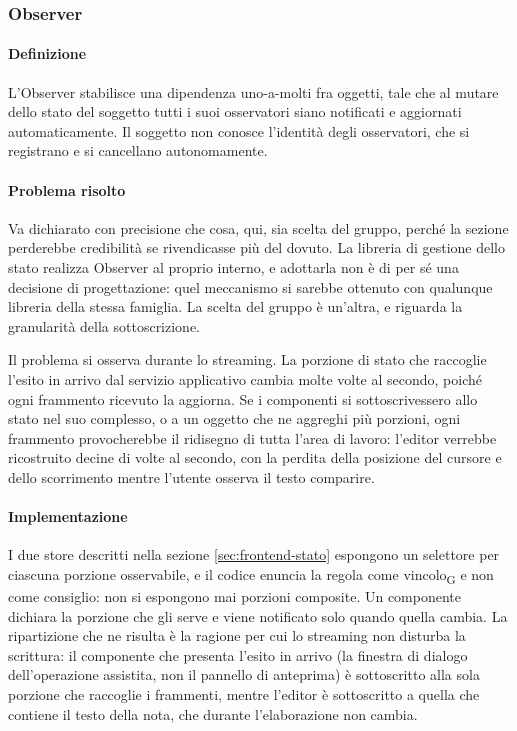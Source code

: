 \documentclass[a4paper, 10pt]{article}
\begin{document}
\subsubsection{Observer}
\label{sec:pattern-observer}

\paragraph{Definizione}
L'Observer stabilisce una dipendenza uno-a-molti fra oggetti, tale che al mutare dello stato del soggetto tutti i suoi osservatori siano notificati e aggiornati automaticamente. Il soggetto non conosce l'identità degli osservatori, che si registrano e si cancellano autonomamente.

\paragraph{Problema risolto}
Va dichiarato con precisione che cosa, qui, sia scelta del gruppo, perché la sezione perderebbe credibilità se rivendicasse più del dovuto. La libreria di gestione dello stato realizza Observer al proprio interno, e adottarla non è di per sé una decisione di progettazione: quel meccanismo si sarebbe ottenuto con qualunque libreria della stessa famiglia. La scelta del gruppo è un'altra, e riguarda la granularità della sottoscrizione.

Il problema si osserva durante lo streaming. La porzione di stato che raccoglie l'esito in arrivo dal servizio applicativo cambia molte volte al secondo, poiché ogni frammento ricevuto la aggiorna. Se i componenti si sottoscrivessero allo stato nel suo complesso, o a un oggetto che ne aggreghi più porzioni, ogni frammento provocherebbe il ridisegno di tutta l'area di lavoro: l'editor verrebbe ricostruito decine di volte al secondo, con la perdita della posizione del cursore e dello scorrimento mentre l'utente osserva il testo comparire.

\paragraph{Implementazione}
I due store descritti nella sezione \ref{sec:frontend-stato} espongono un selettore per ciascuna porzione osservabile, e il codice enuncia la regola come vincolo\textsubscript{G} e non come consiglio: non si espongono mai porzioni composite. Un componente dichiara la porzione che gli serve e viene notificato solo quando quella cambia. La ripartizione che ne risulta è la ragione per cui lo streaming non disturba la scrittura: il componente che presenta l'esito in arrivo (la finestra di dialogo dell'operazione assistita, non il pannello di anteprima) è sottoscritto alla sola porzione che raccoglie i frammenti, mentre l'editor è sottoscritto a quella che contiene il testo della nota, che durante l'elaborazione non cambia.
\end{document}
